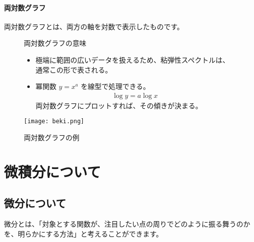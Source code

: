 \documentclass[uplatex,dvipdfmx,a4paper,11pt]{jsarticle}
\begin{document}
\paragraph{両対数グラフ}
両対数グラフとは、両方の軸を対数で表示したものです。
\begin{figure}[htb]
	\begin{center}
		\large
		\begin{minipage}{0.45\textwidth}
			\begin{itembox}[l]{両対数グラフの意味}
				\begin{itemize}
					\item 極端に範囲の広いデータを扱えるため、粘弾性スペクトルは、通常この形で表される。
					\item 冪関数 $y = x^a$ を線型で処理できる。
					\begin{align*}
						\log y = a \log x
					\end{align*}
					両対数グラフにプロットすれば、その傾きが決まる。
				\end{itemize}
			\end{itembox}
		\end{minipage}
		\begin{minipage}{0.45\textwidth}
			\begin{center}
			\texttt{[image: beki.png]}
			\end{center}
		\end{minipage}
		\caption{両対数グラフの例}
		\label{fig:loglog}
	\end{center}
\end{figure}

\section{微積分について}

\subsection{微分について}
微分とは、「対象とする関数が、注目したい点の周りでどのように振る舞うのかを、明らかにする方法」と考えることができます。
\end{document}
